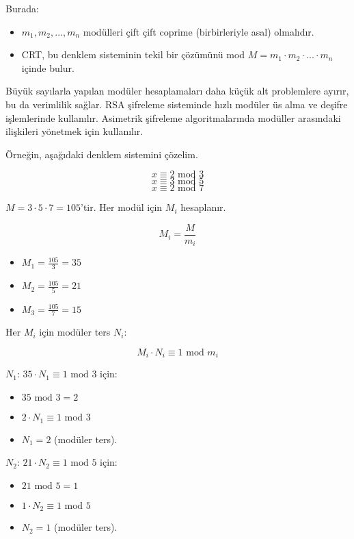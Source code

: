 Burada:

\begin{itemize}
    \item $m_1, m_2, ..., m_n$ modülleri çift çift coprime (birbirleriyle asal) olmalıdır.
    \item CRT, bu denklem sisteminin tekil bir çözümünü mod $M = m_1 \cdot m_2 \cdot ... \cdot m_n$ içinde bulur.
\end{itemize}

Büyük sayılarla yapılan modüler hesaplamaları daha küçük alt problemlere ayırır, bu da verimlilik sağlar. RSA şifreleme sisteminde hızlı modüler üs alma ve deşifre işlemlerinde kullanılır. Asimetrik şifreleme algoritmalarında modüller arasındaki ilişkileri yönetmek için kullanılır.

Örneğin, aşağıdaki denklem sistemini çözelim.

\[ x \equiv 2 \text{ mod } 3 \]
\[ x \equiv 3 \text{ mod } 5 \]
\[ x \equiv 2 \text{ mod } 7 \]

$M = 3 \cdot 5 \cdot 7 = 105$'tir. Her modül için $M_i$ hesaplanır.

\[ M_i = \frac{M}{m_i} \]

\begin{itemize}
    \item $M_1 = \frac{105}{3} = 35$
    \item $M_2 = \frac{105}{5} = 21$
    \item $M_3 = \frac{105}{7} = 15$
\end{itemize}

Her $M_i$ için modüler ters $N_i$:

\[ M_i \cdot N_i \equiv 1 \text{ mod } m_i \]

$N_1$: $35 \cdot N_1 \equiv 1 \text{ mod } 3$ için:

\begin{itemize}
    \item $35 \text{ mod } 3 = 2$
    \item $2 \cdot N_1 \equiv 1 \text{ mod } 3$
    \item $N_1 = 2$ (modüler ters).
\end{itemize}

$N_2$: $21 \cdot N_2 \equiv 1 \text{ mod } 5$ için:

\begin{itemize}
    \item $21 \text{ mod } 5 = 1$
    \item $1 \cdot N_2 \equiv 1 \text{ mod } 5$
    \item $N_2 = 1$ (modüler ters).
\end{itemize}

